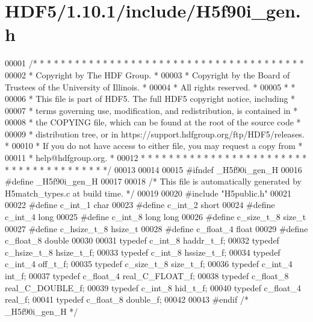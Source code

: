 \hypertarget{_h_d_f5_21_810_81_2include_2_h5f90i__gen_8h_source}{}\section{H\+D\+F5/1.10.1/include/\+H5f90i\+\_\+gen.h}
\label{_h_d_f5_21_810_81_2include_2_h5f90i__gen_8h_source}

\begin{DoxyCode}
00001 \textcolor{comment}{/* * * * * * * * * * * * * * * * * * * * * * * * * * * * * * * * * * * * * * *}
00002 \textcolor{comment}{ * Copyright by The HDF Group.                                               *}
00003 \textcolor{comment}{ * Copyright by the Board of Trustees of the University of Illinois.         *}
00004 \textcolor{comment}{ * All rights reserved.                                                      *}
00005 \textcolor{comment}{ *                                                                           *}
00006 \textcolor{comment}{ * This file is part of HDF5.  The full HDF5 copyright notice, including     *}
00007 \textcolor{comment}{ * terms governing use, modification, and redistribution, is contained in    *}
00008 \textcolor{comment}{ * the COPYING file, which can be found at the root of the source code       *}
00009 \textcolor{comment}{ * distribution tree, or in https://support.hdfgroup.org/ftp/HDF5/releases.  *}
00010 \textcolor{comment}{ * If you do not have access to either file, you may request a copy from     *}
00011 \textcolor{comment}{ * help@hdfgroup.org.                                                        *}
00012 \textcolor{comment}{ * * * * * * * * * * * * * * * * * * * * * * * * * * * * * * * * * * * * * * */}
00013 
00014 
00015 \textcolor{preprocessor}{#ifndef \_H5f90i\_gen\_H}
00016 \textcolor{preprocessor}{#define \_H5f90i\_gen\_H}
00017 
00018 \textcolor{comment}{/* This file is automatically generated by H5match\_types.c at build time. */}
00019 
00020 \textcolor{preprocessor}{#include "H5public.h"}
00021 
00022 \textcolor{preprocessor}{#define c\_int\_1 char}
00023 \textcolor{preprocessor}{#define c\_int\_2 short}
00024 \textcolor{preprocessor}{#define c\_int\_4 long}
00025 \textcolor{preprocessor}{#define c\_int\_8 long long}
00026 \textcolor{preprocessor}{#define c\_size\_t\_8 size\_t}
00027 \textcolor{preprocessor}{#define c\_hsize\_t\_8 hsize\_t}
00028 \textcolor{preprocessor}{#define c\_float\_4 float}
00029 \textcolor{preprocessor}{#define c\_float\_8 double}
00030 
00031 \textcolor{keyword}{typedef} c\_int\_8 haddr\_t\_f;
00032 \textcolor{keyword}{typedef} c\_hsize\_t\_8 hsize\_t\_f;
00033 \textcolor{keyword}{typedef} c\_int\_8 hssize\_t\_f;
00034 \textcolor{keyword}{typedef} c\_int\_4 off\_t\_f;
00035 \textcolor{keyword}{typedef} c\_size\_t\_8 size\_t\_f;
00036 \textcolor{keyword}{typedef} c\_int\_4 int\_f;
00037 \textcolor{keyword}{typedef} c\_float\_4 real\_C\_FLOAT\_f;
00038 \textcolor{keyword}{typedef} c\_float\_8 real\_C\_DOUBLE\_f;
00039 \textcolor{keyword}{typedef} c\_int\_8 hid\_t\_f;
00040 \textcolor{keyword}{typedef} c\_float\_4 real\_f;
00041 \textcolor{keyword}{typedef} c\_float\_8 double\_f;
00042 
00043 \textcolor{preprocessor}{#endif }\textcolor{comment}{/* \_H5f90i\_gen\_H */}\textcolor{preprocessor}{}
\end{DoxyCode}
